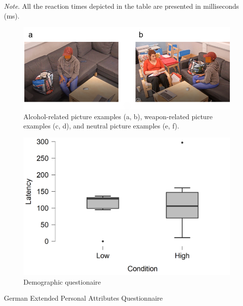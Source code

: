 \documentclass[serif, twocolumn, numeric, empirical]{jote-article}
\begin{document}
\begin{adjustwidth}{0.49in}{0.0in}
\textit{Note}. All the reaction times depicted in the table are presented in milliseconds (ms).\  
\end{adjustwidth}
\begin{figure}[H]
	\centering
	\includegraphics[scale=0.7]{media/image1.png}
	\caption{Alcohol-related picture examples (a, b), weapon-related picture examples (c, d), and neutral picture examples (e, f).}
\end{figure}
\newpage




\begin{figure}[H]
	\centering
	\includegraphics[width=\colwidth]{media/image2.png}
	\caption{Demographic questionaire}
\end{figure}
German Extended Personal Attributes Questionnaire
\end{document}
